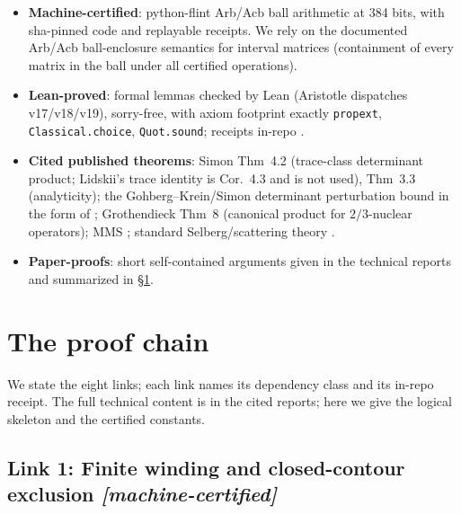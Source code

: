\documentclass[11pt]{article}
\theoremstyle{definition}
\theoremstyle{remark}
\begin{document}
\begin{itemize}
\item \textbf{Machine-certified}: python-flint Arb/Acb ball arithmetic
at 384 bits, with sha-pinned code and replayable receipts. We rely on
the documented Arb/Acb ball-enclosure semantics for interval matrices
(containment of every matrix in the ball under all certified
operations).
\item \textbf{Lean-proved}: formal lemmas checked by Lean
(Aristotle dispatches v17/v18/v19), sorry-free, with axiom footprint
exactly \texttt{propext}, \texttt{Classical.choice},
\texttt{Quot.sound}; receipts in-repo \cite{LeanV17,LeanV18}.
\item \textbf{Cited published theorems}: Simon \cite{Simon77} Thm~4.2
(trace-class determinant product; Lidskii's trace identity is
Cor.~4.3 and is not used), Thm~3.3 (analyticity); the
Gohberg--Krein/Simon determinant perturbation bound in the form of
\cite{SimonTraceIdeals}; Grothendieck \cite{Grothendieck52} Thm~8
(canonical product for $2/3$-nuclear operators); MMS
\cite[Thms~4.10, 6.4]{MMS}; standard Selberg/scattering theory
\cite{HejhalLNM1001,IwaniecGSM53,BorthwickBook}.
\item \textbf{Paper-proofs}: short self-contained arguments given in
the technical reports \cite{R1Restatement,R3bReport,R5Report} and
summarized in \S\ref{sec:chain}.
\end{itemize}

\section{The proof chain}
\label{sec:chain}

We state the eight links; each link names its dependency class and its
in-repo receipt. The full technical content is in the cited reports;
here we give the logical skeleton and the certified constants.

\subsection*{Link 1: Finite winding and closed-contour exclusion
\emph{[machine-certified]}}
\end{document}
